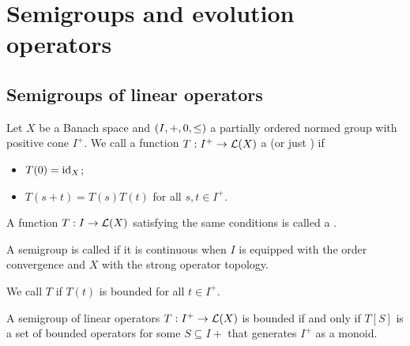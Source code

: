 \chapter{Semigroups and evolution operators}
\section{Semigroups of linear operators}
\begin{definition}
Let $X$ be a Banach space and $\left( I, +, 0, \leq \right)$ a partially ordered normed group with positive cone $I^+$. We call a function $T: I^+ \to \operatorname{\mathcal{L}}(X)$ a  (or just ) if
\begin{itemize}
\item $T(0) = \operatorname{id}_X$;
\item $T(s+t) = T(s)T(t)$ for all $s,t \in I^+$.
\end{itemize}
A function $T: I \to \operatorname{\mathcal{L}}(X)$ satisfying the same conditions is called a .

A semigroup is called  if it is continuous when $I$ is equipped with the order convergence and $X$ with the strong operator topology.

We call $T$  if $T(t)$ is bounded for all $t\in I^+$.
\end{definition}

\begin{lemma}
A semigroup of linear operators $T:I^+\to \operatorname{\mathcal{L}}(X)$ is bounded \textup{if and only if} $T[S]$ is a set of bounded operators for some $S\subseteq I+$ that generates $I^+$ as a monoid.
\end{lemma}

